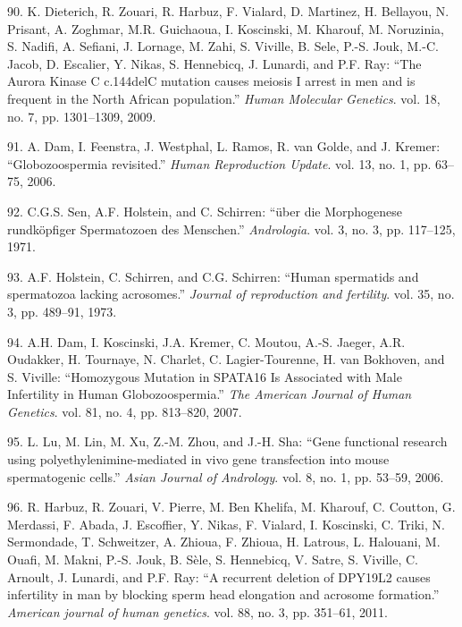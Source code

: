 \documentclass[12pt,a4paper,twoside]{ugathesis}
\theoremstyle{definition}
\theoremstyle{definition}
\theoremstyle{definition}
\theoremstyle{remark}
\begin{document}
\hypertarget{ref-Dieterich2009}{}
90. K. Dieterich, R. Zouari, R. Harbuz, F. Vialard, D. Martinez, H.
Bellayou, N. Prisant, A. Zoghmar, M.R. Guichaoua, I. Koscinski, M.
Kharouf, M. Noruzinia, S. Nadifi, A. Sefiani, J. Lornage, M. Zahi, S.
Viville, B. Sele, P.-S. Jouk, M.-C. Jacob, D. Escalier, Y. Nikas, S.
Hennebicq, J. Lunardi, and P.F. Ray: ``The Aurora Kinase C c.144delC
mutation causes meiosis I arrest in men and is frequent in the North
African population.'' \emph{Human Molecular Genetics}. vol. 18, no. 7,
pp. 1301--1309, 2009.

\hypertarget{ref-Dam2006}{}
91. A. Dam, I. Feenstra, J. Westphal, L. Ramos, R. van Golde, and J.
Kremer: ``Globozoospermia revisited.'' \emph{Human Reproduction Update}.
vol. 13, no. 1, pp. 63--75, 2006.

\hypertarget{ref-Sen2009}{}
92. C.G.S. Sen, A.F. Holstein, and C. Schirren: ``über die Morphogenese
rundköpfiger Spermatozoen des Menschen.'' \emph{Andrologia}. vol. 3, no.
3, pp. 117--125, 1971.

\hypertarget{ref-Holstein1973}{}
93. A.F. Holstein, C. Schirren, and C.G. Schirren: ``Human spermatids
and spermatozoa lacking acrosomes.'' \emph{Journal of reproduction and
fertility}. vol. 35, no. 3, pp. 489--91, 1973.

\hypertarget{ref-Dam2007a}{}
94. A.H. Dam, I. Koscinski, J.A. Kremer, C. Moutou, A.-S. Jaeger, A.R.
Oudakker, H. Tournaye, N. Charlet, C. Lagier-Tourenne, H. van Bokhoven,
and S. Viville: ``Homozygous Mutation in SPATA16 Is Associated with Male
Infertility in Human Globozoospermia.'' \emph{The American Journal of
Human Genetics}. vol. 81, no. 4, pp. 813--820, 2007.

\hypertarget{ref-Lu2006}{}
95. L. Lu, M. Lin, M. Xu, Z.-M. Zhou, and J.-H. Sha: ``Gene functional
research using polyethylenimine-mediated in vivo gene transfection into
mouse spermatogenic cells.'' \emph{Asian Journal of Andrology}. vol. 8,
no. 1, pp. 53--59, 2006.

\hypertarget{ref-Harbuz2011}{}
96. R. Harbuz, R. Zouari, V. Pierre, M. Ben Khelifa, M. Kharouf, C.
Coutton, G. Merdassi, F. Abada, J. Escoffier, Y. Nikas, F. Vialard, I.
Koscinski, C. Triki, N. Sermondade, T. Schweitzer, A. Zhioua, F. Zhioua,
H. Latrous, L. Halouani, M. Ouafi, M. Makni, P.-S. Jouk, B. Sèle, S.
Hennebicq, V. Satre, S. Viville, C. Arnoult, J. Lunardi, and P.F. Ray:
``A recurrent deletion of DPY19L2 causes infertility in man by blocking
sperm head elongation and acrosome formation.'' \emph{American journal
of human genetics}. vol. 88, no. 3, pp. 351--61, 2011.
\end{document}

